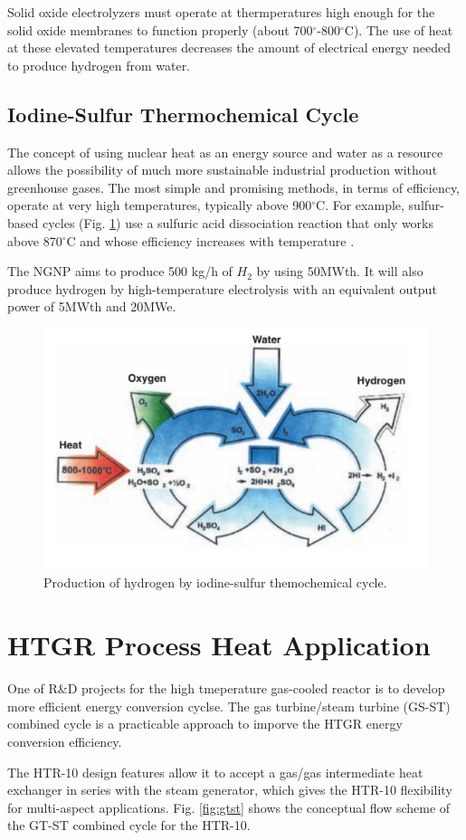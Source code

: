 \documentclass[11pt,letterpaper]{article}
\begin{document}
Solid oxide electrolyzers must operate at thermperatures high enough for the solid oxide membranes to function properly (about 700$^{\circ}$-800$^{\circ}$C). The use of heat at these elevated temperatures decreases the amount of electrical energy needed to produce hydrogen from water.

\subsection{Iodine-Sulfur Thermochemical Cycle}

The concept of using nuclear heat as an energy source and water as a resource allows the possibility of much more sustainable industrial production without greenhouse gases. The most simple and promising methods, in terms of efficiency, operate at very high temperatures, typically above 900$^{\circ}$C. For example, sulfur-based cycles (Fig. \ref{fig:isulfur}) use a sulfuric acid dissociation reaction that only works above 870$^{\circ}$C and whose efficiency increases with temperature \cite{cea_gas-cooled_2006}. 

The NGNP aims to produce 500 kg/h of $H_2$ by using 50MWth. It will also produce hydrogen by high-temperature electrolysis with an equivalent output power of 5MWth and 20MWe.

\begin{figure}[H]
	\centering
	\includegraphics[width=0.4\linewidth]{figures/iodine-sulfur.png}
	\hfill
	\caption{Production of hydrogen by iodine-sulfur themochemical cycle.}
	\label{fig:isulfur}
\end{figure}

\section{HTGR Process Heat Application}

One of R&D projects for the high tmeperature gas-cooled reactor is to develop more efficient energy conversion cyclse. The gas turbine/steam turbine (GS-ST) combined cycle is a practicable approach to imporve the HTGR energy conversion efficiency.

The HTR-10 design features allow it to accept a gas/gas intermediate heat exchanger in series with the steam generator, which gives the HTR-10 flexibility for multi-aspect applications. Fig. \ref{fig:gtst} shows the conceptual flow scheme of the GT-ST combined cycle for the HTR-10.
\end{document}

